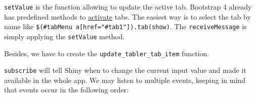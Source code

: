 \documentclass[
]{book}
\newenvironment{Shaded}{\begin{snugshade}}{\end{snugshade}}
\newcommand{\AttributeTok}[1]{\textcolor[rgb]{0.77,0.63,0.00}{#1}}
\newcommand{\ControlFlowTok}[1]{\textcolor[rgb]{0.13,0.29,0.53}{\textbf{#1}}}
\newcommand{\DataTypeTok}[1]{\textcolor[rgb]{0.13,0.29,0.53}{#1}}
\newcommand{\KeywordTok}[1]{\textcolor[rgb]{0.13,0.29,0.53}{\textbf{#1}}}
\newcommand{\NormalTok}[1]{#1}
\newcommand{\OperatorTok}[1]{\textcolor[rgb]{0.81,0.36,0.00}{\textbf{#1}}}
\newcommand{\SpecialCharTok}[1]{\textcolor[rgb]{0.00,0.00,0.00}{#1}}
\newcommand{\StringTok}[1]{\textcolor[rgb]{0.31,0.60,0.02}{#1}}
\newcommand{\VerbatimStringTok}[1]{\textcolor[rgb]{0.31,0.60,0.02}{#1}}
\begin{document}
\texttt{setValue} is the function allowing to update the active tab. Bootstrap 4 already has
predefined methods to \href{https://getbootstrap.com/docs/4.0/components/navs/\#via-javascript}{activate} tabs. The easiest way is to select the tab by name like \texttt{\$(\textquotesingle{}\#tabMenu\ a{[}href="\#tab1"{]}\textquotesingle{}).tab(\textquotesingle{}show\textquotesingle{})}. The \texttt{receiveMessage} is simply applying the \texttt{setValue} method.

\begin{Shaded}
\end{Shaded}

Besides, we have to create the \texttt{update\_tabler\_tab\_item} function.

\begin{Shaded}
\end{Shaded}

\texttt{subscribe} will tell Shiny when to change the current input value and made it available
in the whole app. We may listen to multiple events, keeping in mind that events occur in the following order:
\end{document}
